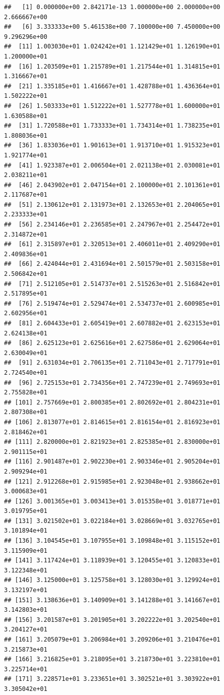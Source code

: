\documentclass[]{book}
\theoremstyle{definition}
\theoremstyle{definition}
\theoremstyle{remark}
\begin{document}
\begin{verbatim}
##   [1] 0.000000e+00 2.842171e-13 1.000000e+00 2.000000e+00 2.666667e+00
##   [6] 3.333333e+00 5.461538e+00 7.100000e+00 7.450000e+00 9.296296e+00
##  [11] 1.003030e+01 1.024242e+01 1.121429e+01 1.126190e+01 1.200000e+01
##  [16] 1.203509e+01 1.215789e+01 1.217544e+01 1.314815e+01 1.316667e+01
##  [21] 1.335185e+01 1.416667e+01 1.428788e+01 1.436364e+01 1.502222e+01
##  [26] 1.503333e+01 1.512222e+01 1.527778e+01 1.600000e+01 1.630588e+01
##  [31] 1.720588e+01 1.733333e+01 1.734314e+01 1.738235e+01 1.808036e+01
##  [36] 1.833036e+01 1.901613e+01 1.913710e+01 1.915323e+01 1.921774e+01
##  [41] 1.923387e+01 2.006504e+01 2.021138e+01 2.030081e+01 2.038211e+01
##  [46] 2.043902e+01 2.047154e+01 2.100000e+01 2.101361e+01 2.117687e+01
##  [51] 2.130612e+01 2.131973e+01 2.132653e+01 2.204065e+01 2.233333e+01
##  [56] 2.234146e+01 2.236585e+01 2.247967e+01 2.254472e+01 2.314872e+01
##  [61] 2.315897e+01 2.320513e+01 2.406011e+01 2.409290e+01 2.409836e+01
##  [66] 2.424044e+01 2.431694e+01 2.501579e+01 2.503158e+01 2.506842e+01
##  [71] 2.512105e+01 2.514737e+01 2.515263e+01 2.516842e+01 2.517895e+01
##  [76] 2.519474e+01 2.529474e+01 2.534737e+01 2.600985e+01 2.602956e+01
##  [81] 2.604433e+01 2.605419e+01 2.607882e+01 2.623153e+01 2.624138e+01
##  [86] 2.625123e+01 2.625616e+01 2.627586e+01 2.629064e+01 2.630049e+01
##  [91] 2.631034e+01 2.706135e+01 2.711043e+01 2.717791e+01 2.724540e+01
##  [96] 2.725153e+01 2.734356e+01 2.747239e+01 2.749693e+01 2.755828e+01
## [101] 2.757669e+01 2.800385e+01 2.802692e+01 2.804231e+01 2.807308e+01
## [106] 2.813077e+01 2.814615e+01 2.816154e+01 2.816923e+01 2.818462e+01
## [111] 2.820000e+01 2.821923e+01 2.825385e+01 2.830000e+01 2.901115e+01
## [116] 2.901487e+01 2.902230e+01 2.903346e+01 2.905204e+01 2.909294e+01
## [121] 2.912268e+01 2.915985e+01 2.923048e+01 2.938662e+01 3.000683e+01
## [126] 3.001365e+01 3.003413e+01 3.015358e+01 3.018771e+01 3.019795e+01
## [131] 3.021502e+01 3.022184e+01 3.028669e+01 3.032765e+01 3.101894e+01
## [136] 3.104545e+01 3.107955e+01 3.109848e+01 3.115152e+01 3.115909e+01
## [141] 3.117424e+01 3.118939e+01 3.120455e+01 3.120833e+01 3.122348e+01
## [146] 3.125000e+01 3.125758e+01 3.128030e+01 3.129924e+01 3.132197e+01
## [151] 3.138636e+01 3.140909e+01 3.141288e+01 3.141667e+01 3.142803e+01
## [156] 3.201587e+01 3.201905e+01 3.202222e+01 3.202540e+01 3.204127e+01
## [161] 3.205079e+01 3.206984e+01 3.209206e+01 3.210476e+01 3.215873e+01
## [166] 3.216825e+01 3.218095e+01 3.218730e+01 3.223810e+01 3.225714e+01
## [171] 3.228571e+01 3.233651e+01 3.302521e+01 3.303922e+01 3.305042e+01

\end{verbatim}
\end{document}
